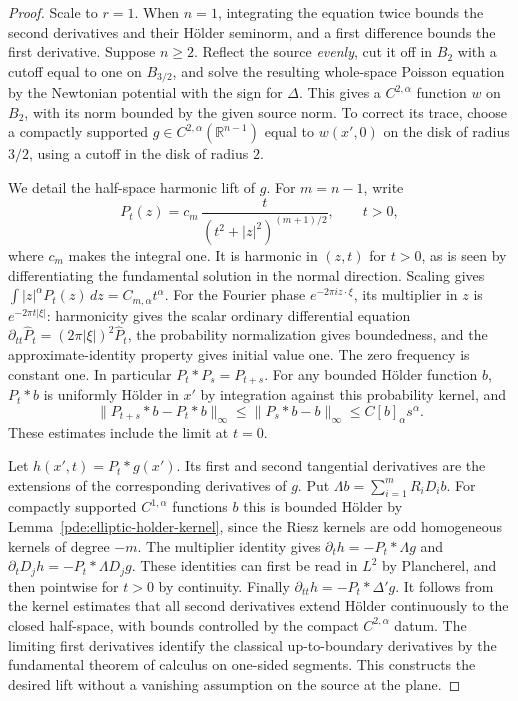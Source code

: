 \documentclass[11pt,oneside,openany]{book}
\theoremstyle{plain}
\theoremstyle{definition}
\theoremstyle{remark}
\begin{document}
\begin{proof}
Scale to \(r=1\). When \(n=1\), integrating the equation twice
bounds the second derivatives and their Hölder seminorm, and a
first difference bounds the first derivative. Suppose \(n\geq2\).
Reflect the source \emph{evenly}, cut it off in \(B_2\) with a
cutoff equal to one on \(B_{3/2}\), and solve the resulting
whole-space Poisson equation by the Newtonian potential with
the sign for \(\Delta\). This gives a \(C^{2,\alpha}\) function
\(w\) on \(B_2\), with its norm bounded by the given source norm.
To correct its trace, choose a compactly supported
\(g\in C^{2,\alpha}(\mathbb R^{n-1})\) equal to \(w(x',0)\)
on the disk of radius \(3/2\), using a cutoff in the disk of
radius \(2\).

We detail the half-space harmonic lift of \(g\).
For \(m=n-1\), write
\[
 P_t(z)=c_m\,\frac{t}{(t^2+|z|^2)^{(m+1)/2}},\qquad t>0,
\]
where \(c_m\) makes the integral one. It is harmonic in
\((z,t)\) for \(t>0\), as is seen by differentiating the
fundamental solution in the normal direction. Scaling gives
\(\int |z|^\alpha P_t(z)\,dz=C_{m,\alpha}t^\alpha\).
For the Fourier phase \(e^{-2\pi i z\cdot\xi}\), its
multiplier in \(z\) is \(e^{-2\pi t|\xi|}\):
harmonicity gives the scalar ordinary differential equation
\(\partial_{tt}\widehat P_t=(2\pi|\xi|)^2\widehat P_t\), the
probability normalization gives boundedness, and the
approximate-identity property gives initial value one.
The zero frequency is constant one. In particular
\(P_t*P_s=P_{t+s}\). For any bounded Hölder function \(b\),
\(P_t*b\) is uniformly Hölder in \(x'\) by integration
against this probability kernel, and
\[
 \|P_{t+s}*b-P_t*b\|_\infty
       \leq \|P_s*b-b\|_\infty\leq C[b]_\alpha s^\alpha .
\]
These estimates include the limit at \(t=0\).

Let \(h(x',t)=P_t*g(x')\).
Its first and second tangential derivatives are the extensions
of the corresponding derivatives of \(g\). Put
\(\Lambda b=\sum_{i=1}^m R_iD_ib\). For compactly supported
\(C^{1,\alpha}\) functions \(b\) this is bounded Hölder
by Lemma~\ref{pde:elliptic-holder-kernel}, since the Riesz
kernels are odd homogeneous kernels of degree \(-m\).
The multiplier identity gives
\(\partial_t h=-P_t*\Lambda g\) and
\(\partial_t D_jh=-P_t*\Lambda D_jg\). These identities
can first be read in \(L^2\) by Plancherel, and then pointwise
for \(t>0\) by continuity. Finally
\(\partial_{tt}h=-P_t*\Delta' g\).
It follows from the kernel estimates that all second
derivatives extend Hölder continuously to the closed
half-space, with bounds controlled by the compact
\(C^{2,\alpha}\) datum. The limiting first derivatives
identify the classical up-to-boundary derivatives by the
fundamental theorem of calculus on one-sided segments.
This constructs the desired lift without a vanishing
assumption on the source at the plane.


\end{proof}
\end{document}
